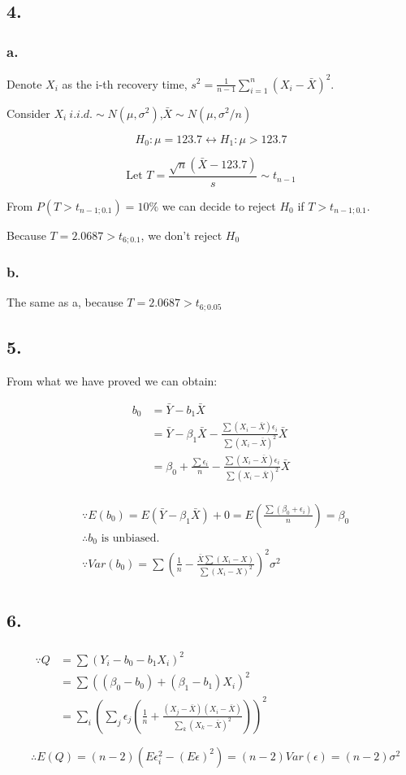 \documentclass[UTF8]{ctexart}
\begin{document}
\subsection{4.}
\subsubsection{a.}
Denote $X_i$ as the i-th recovery time, $s^2=\frac{1}{n-1}\sum_{i=1}^n(X_i-\bar{X})^2$.

Consider $X_i\ i.i.d.\sim N(\mu,\sigma^2)$,$\bar{X}\sim N(\mu,\sigma^2/n)$

$$H_0: \mu=123.7\leftrightarrow H_1:\mu>123.7$$

$$\text{Let }T=\frac{\sqrt{n}(\bar{X}-123.7)}{s}\sim t_{n-1}$$

From $P(T>t_{n-1;0.1})=10\%$ we can decide to reject $H_0$ if $T>t_{n-1;0.1}$.

Because $T=2.0687>t_{6;0.1}$, we don't reject $H_0$


\subsubsection{b.}
The same as a, because $T=2.0687>t_{6;0.05}$

\subsection{5.}
From what we have proved we can obtain:

\begin{align*}
    b_0&=\bar{Y}-b_1\bar{X}\\
    &=\bar{Y}-\beta_1\bar{X}-\frac{\sum(X_i-\bar{X})\epsilon_i}{\sum(X_i-\bar{X})^2}\bar{X}\\
    &=\beta_0+\frac{\sum\epsilon_i}{n}-\frac{\sum(X_i-\bar{X})\epsilon_i}{\sum(X_i-\bar{X})^2}\bar{X}\\
\end{align*}

\begin{align*}
    &\because E(b_0)=E(\bar{Y}-\beta_1\bar{X})+0=E(\frac{\sum(\beta_0+\epsilon_i)}{n})=\beta_0\\
    &\therefore b_0\text{ is unbiased.}\\
    &\because Var(b_0)=\sum(\frac{1}{n}-\frac{\bar{X}\sum(X_i-X)}{\sum(X_i-X)^2})^2\sigma^2\\
\end{align*}

\subsection{6.}
\begin{align*}
    &
    \begin{aligned}
        \because Q&=\sum(Y_i-b_0-b_1X_i)^2\\
        &=\sum((\beta_0-b_0)+(\beta_1-b_1)X_i)^2\\
        &=\sum_i(\sum_j\epsilon_j(\frac{1}{n}+\frac{(X_j-\bar{X})(X_i-\bar{X})}{\sum_k(X_k-\bar{X})^2}))^2\\
    \end{aligned}\\
    &\therefore E(Q)=(n-2)(E\epsilon_i^2-(E\epsilon)^2)=(n-2)Var(\epsilon)=(n-2)\sigma^2
\end{align*}
\end{document}
